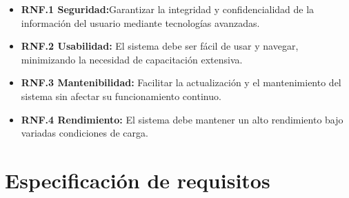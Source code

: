 \begin{itemize}

\item \textbf{RNF.1 Seguridad:}Garantizar la integridad y confidencialidad de la información del usuario mediante tecnologías avanzadas.

\item \textbf{RNF.2 Usabilidad:} El sistema debe ser fácil de usar y navegar, minimizando la necesidad de capacitación extensiva.

\item \textbf{RNF.3 Mantenibilidad:} Facilitar la actualización y el mantenimiento del sistema sin afectar su funcionamiento continuo.

\item \textbf{RNF.4 Rendimiento:} El sistema debe mantener un alto rendimiento bajo variadas condiciones de carga.

\end{itemize}


\section{Especificación de requisitos}


